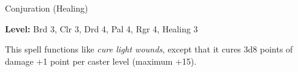 
Conjuration (Healing)

\textbf{Level:} Brd 3, Clr 3, Drd 4, Pal 4, Rgr 4, Healing 3

This spell functions like \textit{cure light wounds}, except that it cures 3d8 
points of damage +1 point per caster level (maximum +15).

